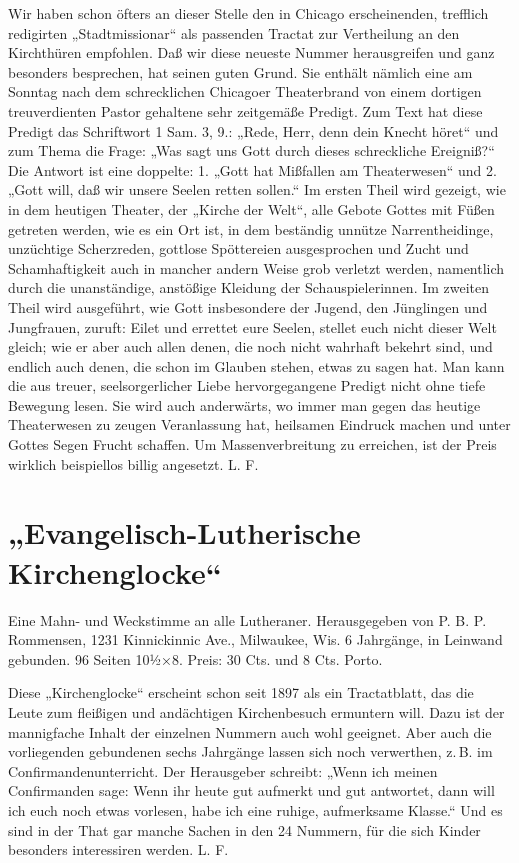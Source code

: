 Wir haben schon öfters an dieser Stelle den in Chicago erscheinenden, trefflich redigirten „Stadtmissionar“ als passenden Tractat zur Vertheilung an den Kirchthüren empfohlen. Daß wir diese neueste Nummer herausgreifen und ganz besonders besprechen, hat seinen guten Grund. Sie enthält nämlich eine am Sonntag nach dem schrecklichen Chicagoer Theaterbrand von einem dortigen treuverdienten Pastor gehaltene sehr zeitgemäße Predigt. Zum Text hat diese Predigt das Schriftwort 1 Sam. 3, 9.: „Rede, Herr, denn dein Knecht höret“ und zum Thema die Frage: „Was sagt uns Gott durch dieses schreckliche Ereigniß?“ Die Antwort ist eine doppelte: 1. „Gott hat Mißfallen am Theaterwesen“ und 2. „Gott will, daß wir unsere Seelen retten sollen.“ Im ersten Theil wird gezeigt, wie in dem heutigen Theater, der „Kirche der Welt“, alle Gebote Gottes mit Füßen getreten werden, wie es ein Ort ist, in dem beständig unnütze Narrentheidinge, unzüchtige Scherzreden, gottlose Spöttereien ausgesprochen und Zucht und Schamhaftigkeit auch in mancher andern Weise grob verletzt werden, namentlich durch die unanständige, anstößige Kleidung der Schauspielerinnen. Im zweiten Theil wird ausgeführt, wie Gott insbesondere der Jugend, den Jünglingen und Jungfrauen, zuruft: Eilet und errettet eure Seelen, stellet euch nicht dieser Welt gleich; wie er aber auch allen denen, die noch nicht wahrhaft bekehrt sind, und endlich auch denen, die schon im Glauben stehen, etwas zu sagen hat. Man kann die aus treuer, seelsorgerlicher Liebe hervorgegangene Predigt nicht ohne tiefe Bewegung lesen. Sie wird auch anderwärts, wo immer man gegen das heutige Theaterwesen zu zeugen Veranlassung hat, heilsamen Eindruck machen und unter Gottes Segen Frucht schaffen. Um Massenverbreitung zu erreichen, ist der Preis wirklich beispiellos billig angesetzt. L. F.

\section[Evangelisch-Lutherische Kirchenglocke]{„Evangelisch-Lutherische Kirchenglocke“}
Eine Mahn- und Weckstimme an alle Lutheraner. Herausgegeben von P. B. P. Rommensen, 1231 Kinnickinnic Ave., Milwaukee, Wis. 6 Jahrgänge, in Leinwand gebunden. 96 Seiten 10½×8. Preis: 30 Cts. und 8 Cts. Porto.

Diese „Kirchenglocke“ erscheint schon seit 1897 als ein Tractatblatt, das die Leute zum fleißigen und andächtigen Kirchenbesuch ermuntern will. Dazu ist der mannigfache Inhalt der einzelnen Nummern auch wohl geeignet. Aber auch die vorliegenden gebundenen sechs Jahrgänge lassen sich noch verwerthen, z.\,B. im Confirmandenunterricht. Der Herausgeber schreibt: „Wenn ich meinen Confirmanden sage: Wenn ihr heute gut aufmerkt und gut antwortet, dann will ich euch noch etwas vorlesen, habe ich eine ruhige, aufmerksame Klasse.“ Und es sind in der That gar manche Sachen in den 24 Nummern, für die sich Kinder besonders interessiren werden. L. F.

